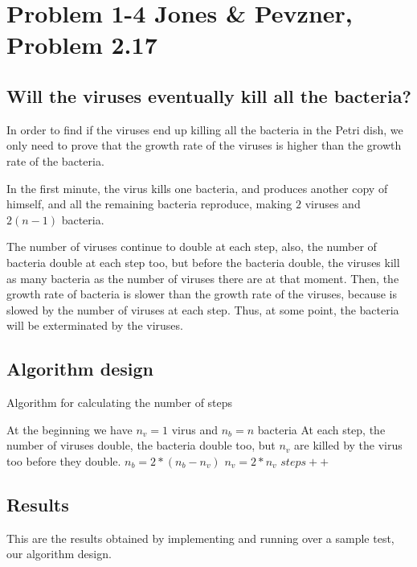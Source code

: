 \documentclass{article}
\begin{document}
\section*{Problem 1-4 Jones \& Pevzner, Problem 2.17}

\subsection*{Will the viruses eventually kill all the bacteria?}
In order to find if the viruses end up killing all the bacteria in the Petri dish, we only need to prove that the growth rate of the viruses is higher than the growth rate of the bacteria.

In the first minute, the virus kills one bacteria, and produces another copy of himself, and all the remaining bacteria reproduce, making $2$ viruses and $2(n-1)$ bacteria.

The number of viruses continue to double at each step, also, the number of bacteria double at each step too, but before the bacteria double, the viruses kill as many bacteria as the number of viruses there are at that moment. Then, the growth rate of bacteria is slower than the growth rate of the viruses, because is slowed by the number of viruses at each step. Thus, at some point, the bacteria will be exterminated by the viruses.

\subsection*{Algorithm design}

\begin{algorithm}[H]
\caption{Algorithm for calculating the number of steps}
\begin{algorithmic}[1]
\State At the beginning we have $n_v = 1$ virus and $n_b = n$ bacteria
\State At each step, the number of viruses double, the bacteria double too, but $n_v$ are killed by the virus too before they double.
 \State $n_b = 2*(n_b-n_v)$
 \State $n_v = 2*n_v$
 \State $steps++$
\EndWhile
\end{algorithmic}
\end{algorithm}

\subsection*{Results}

This are the results obtained by implementing and running over a sample test, our algorithm design.
\end{document}

